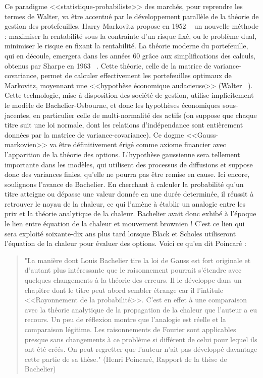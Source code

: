 \documentclass{article}
\begin{document}
Ce paradigme <<statistique-probabiliste>> des marchés, pour reprendre les termes de Walter, va être accentué par le développement parallèle de la théorie de gestion des protefeuilles. Harry Markovitz propose en 1952 ~\cite{Markowitz} un nouvelle méthode : maximiser la rentabilité sous la contrainte d'un risque fixé, ou le problème dual, minimiser le risque en fixant la rentabilité. La théorie moderne du portefeuille, qui en découle, emergera dans les années 60 grâce aux simplifications des calculs, obtenus par Sharpe en 1963 ~\cite{Sharpe}. Cette théorie, celle de la matrice de variance-covariance, permet de calculer effectivement les portefeuilles optimaux de Markovitz, moyennant une <<hypothèse économique audacieuse>> (Walter ~\cite{Walter}). Cette technologie, mise à disposition des société de gestion, utilise implicitement le modèle de Bachelier-Osbourne, et donc les hypothèses économiques sous-jacentes, en particulier celle de multi-normalité des actifs (on suppose que chaque titre suit une loi normale, dont les relations d'indépendance sont entièrement données par la matrice de variance-covariance). Ce dogme <<Gauss-markovien>> va être définitivement érigé comme axiome financier avec l'apparition de la théorie des options. L'hypothèse gaussienne sera tellement importante dans les modèles, qui utilisent des processus de diffusions et suppose donc des variances finies, qu'elle ne pourra pas être remise en cause. Ici encore, soulignons l'avance de Bachelier. En cherchant à calculer la probabilité qu'un titre atteigne ou dépasse une valeur donnée en une durée determinée, il réussit à retrouver le noyau de la chaleur, ce qui l'amène à établir un analogie entre les prix et la théorie analytique de la chaleur. Bachelier avait donc exhibé à l'époque le lien entre équation de la chaleur et mouvement brownien ! C'est ce lien qui sera exploité soixante-dix ans plus tard lorsque Black et Scholes utiliseront l'équation de la chaleur pour évaluer des options. Voici ce qu'en dit Poincaré :\\

\begin{quotation}
"La manière dont Louis Bachelier tire la loi de Gauss est fort originale et d'autant plus intéressante que le raisonnement pourrait s'étendre avec quelques changements à la théorie des erreurs. Il le développe dans un chapitre dont le titre peut abord sembler étrange car il l'intitule <<Rayonnement de la probabilité>>. C'est en effet à une comparaison avec la théorie analytique de la propagation de la chaleur que l'auteur a eu recours. Un peu de réflexion montre que l'analogie est réelle et la comparaison légitime. Les raisonnements de Fourier sont applicables presque sans changements à ce problème si différent de celui pour lequel ils ont été créés. On peut regretter que l'auteur n'ait pas développé davantage cette partie de sa thèse." (Henri Poincaré, Rapport de la thèse de Bachelier)
\end{quotation}
\end{document}
